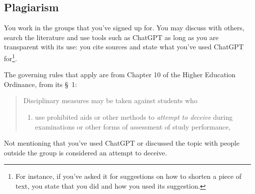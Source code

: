 \subsection{Plagiarism}

You work in the groups that you've signed up for.
You may discuss with others, search the literature and use tools such as 
ChatGPT as long as you are transparent with its use:
\ie you cite sources and state what you've used ChatGPT for\footnote{%
  For instance, if you've asked it for suggestions on how to shorten a piece of 
  text, you state that you did and how you used its suggestion.
}.

The governing rules that apply are from Chapter 10 of the Higher Education 
Ordinance, from its \S~1:
\begin{quote}
  Disciplinary measures may be taken against students who
  \begin{enumerate}
    \item use prohibited aids or other methods to \emph{attempt to deceive} 
       during examinations or other forms of assessment of 
      study performance,
  \end{enumerate}
\end{quote}

Not mentioning that you've used ChatGPT or discussed the topic with people 
outside the group is considered an attempt to deceive.
